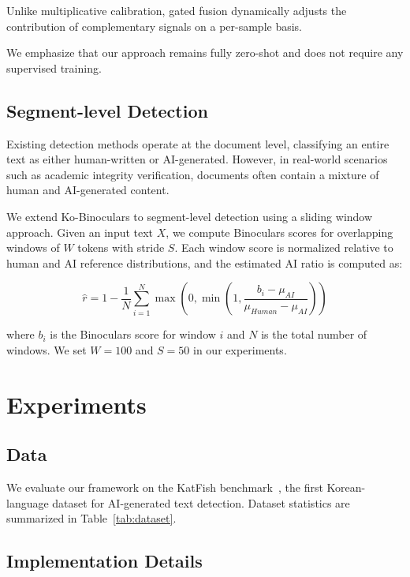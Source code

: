 \documentclass{article}
\begin{document}
Unlike multiplicative calibration, gated fusion dynamically adjusts the contribution of complementary signals on a per-sample basis.

We emphasize that our approach remains fully zero-shot and does not require any supervised training.

\subsection{Segment-level Detection}

Existing detection methods operate at the document level, classifying an entire text as either human-written or AI-generated. However, in real-world scenarios such as academic integrity verification, documents often contain a mixture of human and AI-generated content.

We extend Ko-Binoculars to segment-level detection using a sliding window approach. Given an input text $X$, we compute Binoculars scores for overlapping windows of $W$ tokens with stride $S$. Each window score is normalized relative to human and AI reference distributions, and the estimated AI ratio is computed as:

$$\hat{r} = 1 - \frac{1}{N} \sum_{i=1}^{N} \max\left(0, \min\left(1, \frac{b_i - \mu_{AI}}{\mu_{Human} - \mu_{AI}}\right)\right)$$

where $b_i$ is the Binoculars score for window $i$ and $N$ is the total number of windows. We set $W = 100$ and $S = 50$ in our experiments.

\section{Experiments}

\subsection{Data}

We evaluate our framework on the KatFish benchmark~\cite{park2025katfishnet}, the first Korean-language dataset for AI-generated text detection. Dataset statistics are summarized in Table~\ref{tab:dataset}.

\subsection{Implementation Details}
\end{document}
